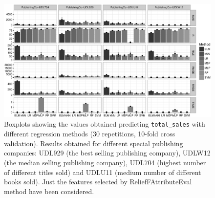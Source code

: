 \documentclass[a4paper,10pt,twocolumn,preprint,3p]{elsarticle}
\begin{document}
\begin{table}
\caption{Description of publishing companies considered as special cases.}
\centering{}%
\label{Table:special_cases}
\end{table}


\begin{figure}[ht]
\begin{center}
\includegraphics[scale=0.6]{./imgs/attribute_All.eps}
\end{center}
\caption{Boxplots showing the values obtained predicting \texttt{total\_sales} with different regression methods (30 repetitions, 10-fold cross validation). Results obtained for different special publishing companies: UDL929 (the best selling publishing company), UDLW12 (the median selling publishing company), UDL704 (highest number of different titles sold) and UDLU11 (medium number of different books sold). Just the features selected by ReliefFAttributeEval method have been considered.}
\label{fig:attributeAll}
\end{figure}
\end{document}
